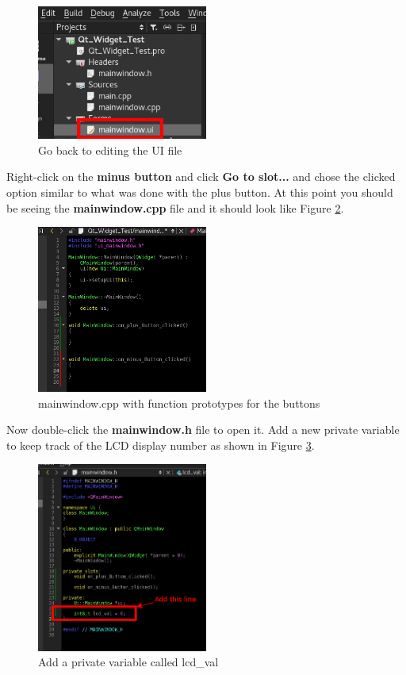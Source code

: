 \documentclass{article}
\begin{document}
	\begin{figure}[H]
		\centering
		\includegraphics[width=0.5\textwidth]{pics/UI_File.png}
		\caption{Go back to editing the UI file}
		\label{UI_File}
	\end{figure}

Right-click on the \textbf{minus button} and click \textbf{Go to slot...} and chose the clicked option similar to what was done with the plus button. At this point you should be seeing the \textbf{mainwindow.cpp} file and it should look like Figure \ref{Empty_Button_Slots}.

	\begin{figure}[H]
		\centering
		\includegraphics[width=0.5\textwidth]{pics/Empty_Button_Slots.png}
		\caption{mainwindow.cpp with function prototypes for the buttons}
		\label{Empty_Button_Slots}
	\end{figure}

Now double-click the \textbf{mainwindow.h} file to open it. Add a new private variable to keep track of the LCD display number as shown in Figure \ref{lcd_val}.

	\begin{figure}[H]
		\centering
		\includegraphics[width=0.5\textwidth]{pics/lcd_val.png}
		\caption{Add a private variable called lcd\_val}
		\label{lcd_val}
	\end{figure}
\end{document}
